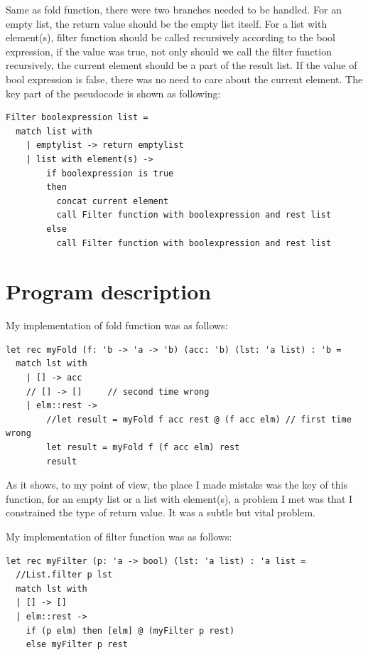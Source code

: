 \documentclass{article}
\begin{document}
Same as fold function, there were two branches needed to be handled. For an empty list, the return value should be the empty list itself. For a list with element(s), filter function should be called recursively according to the bool expression, if the value was true, not only should we call the filter function recursively, the current element should be a part of the result list. If the value of bool expression is false, there was no need to care about the current element. The key part of the pseudocode is shown as following:

\begin{lstlisting}
Filter boolexpression list =
  match list with
    | emptylist -> return emptylist
    | list with element(s) -> 
        if boolexpression is true
        then
          concat current element 
          call Filter function with boolexpression and rest list
        else
          call Filter function with boolexpression and rest list  

\end{lstlisting}

\section{Program description}

My implementation of fold function was as follows:

\begin{lstlisting}
let rec myFold (f: 'b -> 'a -> 'b) (acc: 'b) (lst: 'a list) : 'b =
  match lst with
    | [] -> acc
    // [] -> []		// second time wrong
    | elm::rest -> 
        //let result = myFold f acc rest @ (f acc elm) // first time wrong
        let result = myFold f (f acc elm) rest
        result
\end{lstlisting}

As it shows, to my point of view, the place I made mistake was the key of this function, for an empty list or a list with element(s), a problem I met was that I constrained the type of return value. It was a subtle but vital problem.

My implementation of filter function was as follows:

\begin{lstlisting}
let rec myFilter (p: 'a -> bool) (lst: 'a list) : 'a list =
  //List.filter p lst
  match lst with
  | [] -> []
  | elm::rest -> 
    if (p elm) then [elm] @ (myFilter p rest)
    else myFilter p rest
\end{lstlisting}
\end{document}
